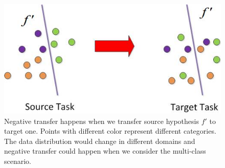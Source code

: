 
\begin{figure}
\centering
\includegraphics[scale=.5]{fig/domain2.jpg}
\caption{Negative transfer happens when we transfer source hypothesis $f'$ to target one. Points with different color represent different categories. The data distribution would change in different domains and negative transfer could happen when we consider the multi-class scenario. }\label{fig:distribution}
\end{figure}

